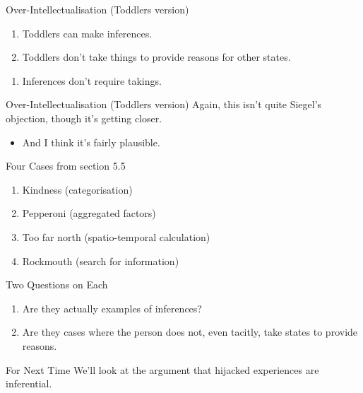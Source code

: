 \documentclass[
  17pt,
  letterpaper,
  ignorenonframetext,
  aspectratio=169,
  xcolor={dvipsnames}]{beamer}
\providecommand{\tightlist}{%
  \setlength{\itemsep}{0pt}\setlength{\parskip}{0pt}}\usepackage{longtable,booktabs,array}
\begin{document}
\begin{frame}{Over-Intellectualisation (Toddlers version)}
\protect\hypertarget{over-intellectualisation-toddlers-version}{}
\begin{enumerate}[<+->]
\tightlist
\item
  Toddlers can make inferences.
\item
  Toddlers don't take things to provide reasons for other states.
\end{enumerate}

\begin{enumerate}[<+->]
[A.]
\setcounter{enumi}{2}
\tightlist
\item
  Inferences don't require takings.
\end{enumerate}
\end{frame}

\begin{frame}{Over-Intellectualisation (Toddlers version)}
\protect\hypertarget{over-intellectualisation-toddlers-version-1}{}
Again, this isn't quite Siegel's objection, though it's getting closer.

\begin{itemize}[<+->]
\tightlist
\item
  And I think it's fairly plausible.
\end{itemize}
\end{frame}

\begin{frame}{Four Cases from section 5.5}
\protect\hypertarget{four-cases-from-section-5.5}{}
\begin{enumerate}[<+->]
\tightlist
\item
  Kindness (categorisation)
\item
  Pepperoni (aggregated factors)
\item
  Too far north (spatio-temporal calculation)
\item
  Rockmouth (search for information)
\end{enumerate}
\end{frame}

\begin{frame}{Two Questions on Each}
\protect\hypertarget{two-questions-on-each}{}
\begin{enumerate}[<+->]
\tightlist
\item
  Are they actually examples of inferences?
\item
  Are they cases where the person does not, even tacitly, take states to
  provide reasons.
\end{enumerate}
\end{frame}

\begin{frame}{For Next Time}
\protect\hypertarget{for-next-time}{}
We'll look at the argument that hijacked experiences are inferential.
\end{frame}
\end{document}
